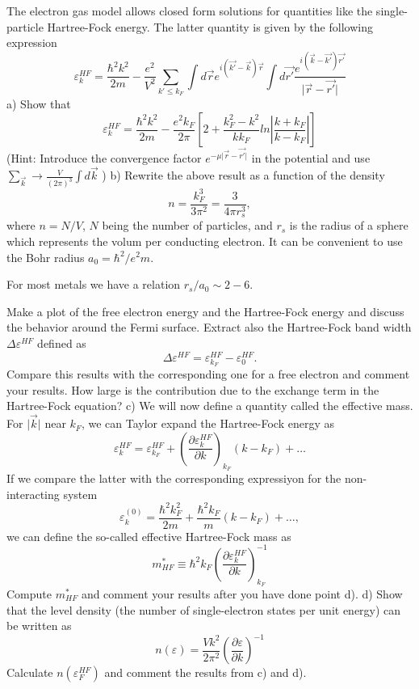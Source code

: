 \begin{prob}

The electron gas model allows closed form solutions for quantities like the 
single-particle Hartree-Fock energy.  The latter quantity is given by the following expression
\[
\varepsilon_{k}^{HF}=\frac{\hbar^{2}k^{2}}{2m}-\frac{e^{2}}
{V^{2}}\sum_{k'\leq
k_{F}}\int d\vec{r}e^{i(\vec{k'}-\vec{k})\vec{r}}\int
d\vec{r'}\frac{e^{i(\vec{k}-\vec{k'})\vec{r'}}}
{\vert\vec{r}-\vec{r'}\vert}
\]
a) Show that
\[
\varepsilon_{k}^{HF}=\frac{\hbar^{2}k^{2}}{2m}-\frac{e^{2}
k_{F}}{2\pi}
\left[
2+\frac{k_{F}^{2}-k^{2}}{kk_{F}}ln\left\vert\frac{k+k_{F}}
{k-k_{F}}\right\vert
\right]
\]
(Hint: Introduce the convergence factor 
$e^{-\mu\vert\vec{r}-\vec{r'}\vert}$
in the potential and use  $\sum_{\vec{k}}\rightarrow
\frac{V}{(2\pi)^{3}}\int d\vec{k}$ )
\newline
b) Rewrite the above result as a function of the density
\[
n= \frac{k_F^3}{3\pi^2}=\frac{3}{4\pi r_s^3},
\]
where $n=N/V$, $N$ being the number of particles, and $r_s$ is the radius of a sphere which represents the volum per conducting electron.  
It can be convenient to use the Bohr radius $a_0=\hbar^2/e^2m$.

For most metals we have a relation $r_s/a_0\sim 2-6$.

Make a plot of the free electron energy and the Hartree-Fock energy
and discuss the behavior around the Fermi surface. Extract also  
the Hartree-Fock band width $\Delta\varepsilon^{HF}$ defined as
\[ \Delta\varepsilon^{HF}=\varepsilon_{k_{F}}^{HF}-
\varepsilon_{0}^{HF}.\]
Compare this results with the corresponding one for a free electron and comment
your results. How large is the contribution due to the exchange term in the Hartree-Fock equation?\newline
c) We will now define a quantity called the effective mass.
For $\vert\vec{k}\vert$ near $k_{F}$, we can Taylor expand the Hartree-Fock energy as  
\[
\varepsilon_{k}^{HF}=\varepsilon_{k_{F}}^{HF}+
\left(\frac{\partial
\varepsilon_{k}^{HF}}{\partial k}\right)_{k_{F}}(k-k_{F})+\dots
\]
If we compare the latter with the corresponding expressiyon for the non-interacting system
\[
\varepsilon_{k}^{(0)}=\frac{\hbar^{2}k^{2}_{F}}{2m}+
\frac{\hbar^{2}k_{F}}{m}\left(k-k_{F}\right)+\dots ,
\]
we can define the so-called effective Hartree-Fock mass as
\[
m_{HF}^{*}\equiv\hbar^{2}k_{F}\left(
\frac{\partial\varepsilon_{k}^{HF}}
{\partial k}\right)_{k_{F}}^{-1}
\]
Compute $m_{HF}^{*}$ and comment your results after you have done 
point d). \newline
d) Show that the level density (the number of single-electron states
per unit energy) can be written as
\[
n(\varepsilon)=\frac{Vk^{2}}{2\pi^{2}}\left(
\frac{\partial\varepsilon}{\partial k}\right)^{-1}
\]
Calculate $n(\varepsilon_{F}^{HF})$ and comment the results from c) and d).
\end{prob}
